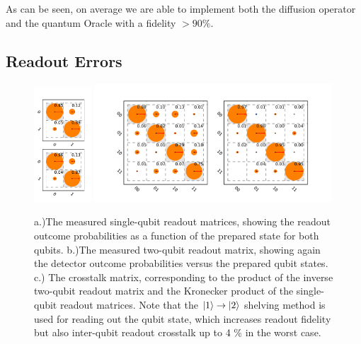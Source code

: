 As can be seen, on average we are able to implement both the diffusion operator and the quantum Oracle with a fidelity $>90\%$.
\subsection{Readout Errors}

\begin{figure}[ht!]
	\centering
\includegraphics[width=0.19\textwidth]{"./data/ct5/2011_04_21 - grover and tomo/good_data/single qubit readouts"}
\includegraphics[width=0.79\textwidth]{"./data/ct5/2011_04_21 - grover and tomo/good_data/readout and crosstalk - 2 plots"}
	\caption[Measured single- and two-qubit readout matrices and crosstalk matrix for the Grover search algorithm experiment]{a.)The measured single-qubit readout matrices, showing the readout outcome probabilities as a function of the prepared state for both qubits. b.)The measured two-qubit readout matrix, showing again the detector outcome probabilities versus the prepared qubit states. c.) The crosstalk matrix, corresponding to the product of the inverse two-qubit readout matrix and the Kronecker product of the single-qubit readout matrices. Note that the $\left| 1 \right>\to\left| 2 \right>$ shelving method is used for reading out the qubit state, which increases readout fidelity but also inter-qubit readout crosstalk up to 4 \% in the worst case.}
	\label{fig:GroverReadoutMatrix}
\end{figure}

